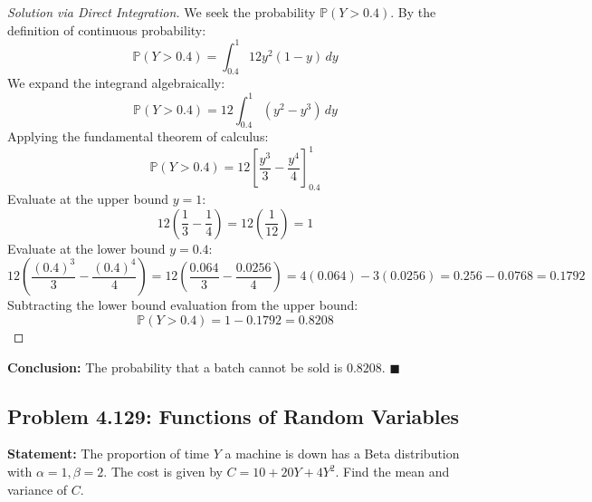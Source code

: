 \documentclass[11pt, a4paper]{article}
\theoremstyle{definition}
\theoremstyle{remark}
\newcommand{\Prob}{\mathbb{P}}
\begin{document}
\begin{proof}[Solution via Direct Integration]
We seek the probability $\Prob(Y > 0.4)$. By the definition of continuous probability:
\[
\Prob(Y > 0.4) = \int_{0.4}^{1} 12y^2(1-y) \, dy
\]
We expand the integrand algebraically:
\[
\Prob(Y > 0.4) = 12 \int_{0.4}^{1} (y^2 - y^3) \, dy
\]
Applying the fundamental theorem of calculus:
\[
\Prob(Y > 0.4) = 12 \left[ \frac{y^3}{3} - \frac{y^4}{4} \right]_{0.4}^{1}
\]
Evaluate at the upper bound $y=1$:
\[
12 \left( \frac{1}{3} - \frac{1}{4} \right) = 12 \left( \frac{1}{12} \right) = 1
\]
Evaluate at the lower bound $y=0.4$:
\[
12 \left( \frac{(0.4)^3}{3} - \frac{(0.4)^4}{4} \right) = 12 \left( \frac{0.064}{3} - \frac{0.0256}{4} \right) = 4(0.064) - 3(0.0256) = 0.256 - 0.0768 = 0.1792
\]
Subtracting the lower bound evaluation from the upper bound:
\[
\Prob(Y > 0.4) = 1 - 0.1792 = 0.8208
\]
\end{proof}
\textbf{Conclusion:} The probability that a batch cannot be sold is $0.8208$. $\blacksquare$

\subsection{Problem 4.129: Functions of Random Variables}
\textbf{Statement:} The proportion of time $Y$ a machine is down has a Beta distribution with $\alpha=1, \beta=2$. The cost is given by $C = 10 + 20Y + 4Y^2$. Find the mean and variance of $C$.
\end{document}

